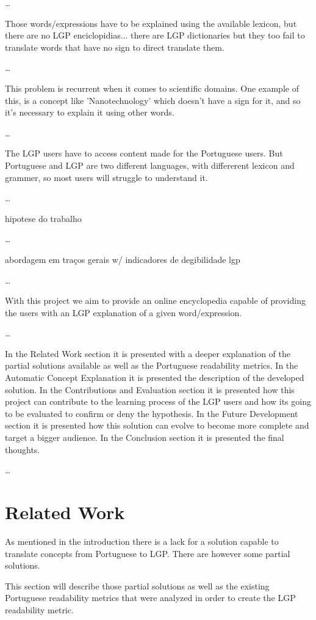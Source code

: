 \documentclass[runningheads]{llncs}
\begin{document}
\dots

Those words/expressions have to be explained using the available lexicon, but there are no LGP enciclopidias...
there are LGP dictionaries but they too fail to translate words that have no sign to direct translate them.

\dots

This problem is recurrent when it comes to scientific domains.
One example of this, is a concept like 'Nanotechnology' which doesn't have a sign for it, and so it's necessary to explain it using other words.

\dots

The LGP users have to access content made for the Portuguese users.
But Portuguese and LGP are two different languages, with differerent lexicon and grammer, so most users will struggle to understand it.

\dots

hipotese do trabalho

\dots

abordagem em traços gerais w/ indicadores de degibilidade lgp

\dots

With this project we aim to provide an online encyclopedia capable of providing the users with an LGP explanation of a given word/expression.

\dots

In the Related Work section it is presented with a deeper explanation of the partial solutions available as well as the Portuguese readability metrics.
In the Automatic Concept Explanation it is presented the description of the developed solution.
In the Contributions and Evaluation section it is presented how this project can contribute to the learning process of the LGP users and how its going to be evaluated to confirm or deny the hypothesis.
In the Future Development section it is presented how this solution can evolve to become more complete and target a bigger audience.
In the Conclusion section it is presented the final thoughts.

\dots

\section{Related Work}

As mentioned in the introduction there is a lack for a solution capable to translate concepts from Portuguese to LGP.
There are however some partial solutions.

This section will describe those partial solutions as well as the existing Portuguese readability metrics that were analyzed in order to create the LGP readability metric.
\end{document}
